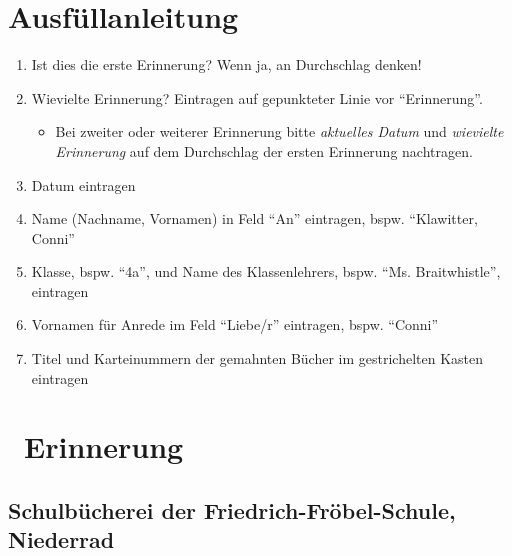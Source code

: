 \documentclass[
	version=last,
	fontsize=12pt,
	parskip=half,
	sfdefaults=true,
	usegeometry
]{scrartcl}
\newcommand{\filledfield}[1]{{\gorri\Large#1}}
\begin{document}
\section*{Ausfüllanleitung}

\begin{enumerate}
	\item Ist dies die erste Erinnerung? Wenn ja, an Durchschlag denken!
	\item Wievielte Erinnerung? Eintragen auf gepunkteter Linie vor \enquote{Erinnerung}.
	\begin{itemize}
		\item Bei zweiter oder weiterer Erinnerung bitte \emph{aktuelles Datum} und \emph{wievielte Erinnerung} auf dem Durchschlag der ersten Erinnerung nachtragen.
	\end{itemize}
	\item Datum eintragen
	\item Name (Nachname, Vornamen) in Feld \enquote{An} eintragen, bspw. \enquote{Klawitter, Conni}
	\item Klasse, bspw. \enquote{4a}, und Name des Klassenlehrers, bspw. \enquote{Ms. Braitwhistle}, eintragen
	\item Vornamen für Anrede im Feld \enquote{Liebe/r} eintragen, bspw. \enquote{Conni}
	\item Titel und Karteinummern der gemahnten Bücher im gestrichelten Kasten eintragen
\end{enumerate}


\section*{\makebox[1em]{\normalsize\textcolor{gray}{\filledfield{\Huge 3.}}}~Erinnerung}
\vspace*{-1ex}
\subsection*{Schulbücherei der Friedrich-Fröbel-Schule, Niederrad}


\end{document}
